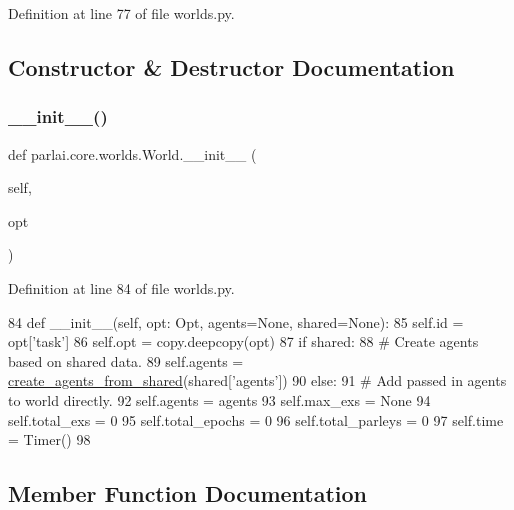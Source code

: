 Definition at line 77 of file worlds.\+py.



\subsection{Constructor \& Destructor Documentation}
\mbox{\label{classparlai_1_1core_1_1worlds_1_1World_a6e346d06369a49c753f568b7694c9439}} 
\subsubsection{\texorpdfstring{\+\_\+\+\_\+init\+\_\+\+\_\+()}{\_\_init\_\_()}}
{\footnotesize\ttfamily def parlai.\+core.\+worlds.\+World.\+\_\+\+\_\+init\+\_\+\+\_\+ (\begin{DoxyParamCaption}\item[{}]{self,  }\item[{}]{opt }\end{DoxyParamCaption})}



Definition at line 84 of file worlds.\+py.


\begin{DoxyCode}
84     \textcolor{keyword}{def }\_\_init\_\_(self, opt: Opt, agents=\textcolor{keywordtype}{None}, shared=\textcolor{keywordtype}{None}):
85         self.id = opt[\textcolor{stringliteral}{'task'}]
86         self.opt = copy.deepcopy(opt)
87         \textcolor{keywordflow}{if} shared:
88             \textcolor{comment}{# Create agents based on shared data.}
89             self.agents = \hyperlink{namespaceparlai_1_1core_1_1agents_a5600530545f5e60a79e2d657b5af1d8c}{create\_agents\_from\_shared}(shared[\textcolor{stringliteral}{'agents'}])
90         \textcolor{keywordflow}{else}:
91             \textcolor{comment}{# Add passed in agents to world directly.}
92             self.agents = agents
93         self.max\_exs = \textcolor{keywordtype}{None}
94         self.total\_exs = 0
95         self.total\_epochs = 0
96         self.total\_parleys = 0
97         self.time = Timer()
98 
\end{DoxyCode}


\subsection{Member Function Documentation}
\mbox{\label{classparlai_1_1core_1_1worlds_1_1World_a714433529a05cc3862ad3b8ade4628f7}} 
